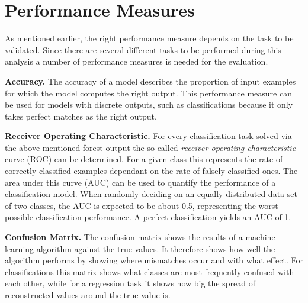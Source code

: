 \section{Performance Measures}
%
As mentioned earlier, the right performance measure depends on the task to be
validated. Since there are several different tasks to be performed during this
analysis a number of performance measures is needed for the evaluation.

\textbf{Accuracy.} The accuracy of a model describes the proportion of input
examples for which the model computes the right output. This performance
measure can be used for models with discrete outputs, such as classifications
because it only takes perfect matches as the right output.

\textbf{Receiver Operating Characteristic.} For every classification task solved via the above mentioned forest output the
so called \textit{receiver operating characteristic} curve (ROC) can be
determined. For a given class this represents the rate of correctly classified
examples dependant on the rate of falsely classified ones. The area under this
curve (AUC) can be used to quantify the performance of a classification model.
When randomly deciding on an equally distributed data set of two classes, the
AUC is expected to be about \num{0.5}, representing the worst possible
classification performance. A perfect classification yields an AUC of \num{1}.

\textbf{Confusion Matrix.} The confusion matrix shows the results of a machine
learning algorithm against the true values. It therefore shows how well the
algorithm performs by showing where mismatches occur and with what effect. For
classifications this matrix shows what classes are most frequently confused
with each other, while for a regression task it shows how big the spread of
reconstructed values around the true value is.

